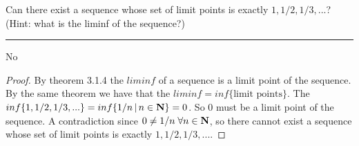 \documentclass[11pt]{article}
\begin{document}
\newpage
{}
 Can there exist a sequence whose set of limit points is exactly $1, 1/2, 1/3, ...$? (Hint: what is the liminf of the sequence?)
 \hrule
 
 No
 
 \begin{proof}
 
 By theorem 3.1.4 the $liminf$ of a sequence is a limit point of the sequence. By the same theorem we have that the $liminf = inf\{\text{limit points}\}$. The $inf\{1, 1/2, 1/3, ...\} = inf\{1/n \, | \, n \in \mathbf{N}\} = 0$. So $0$ must be a limit point of the sequence. A contradiction since $0 \neq 1/n \; \forall n \in \mathbf{N}$, so there cannot exist a sequence whose set of limit points is exactly $1, 1/2, 1/3, ...$.
 \end{proof}
\end{document}
